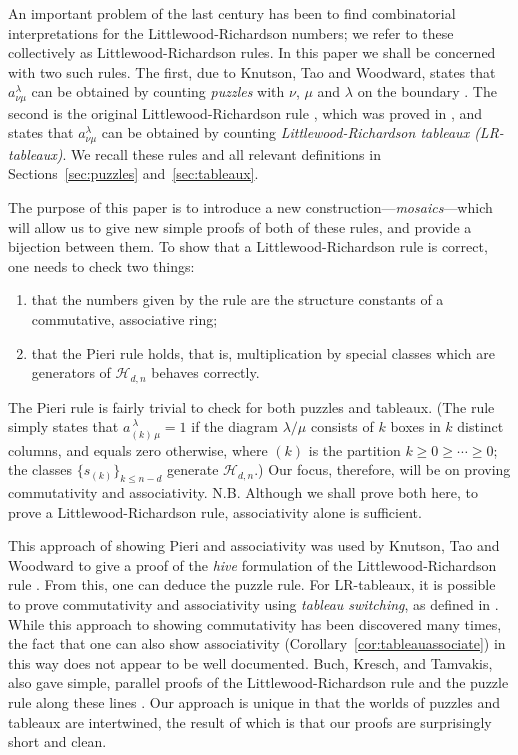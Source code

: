 \documentclass[12pt]{article}
\newcommand{\ringH}{\mathcal{H}_{d,n}}
\begin{document}
An important problem of the last century has been to find
combinatorial interpretations for the Littlewood-Richardson numbers;
we refer to these collectively as Littlewood-Richardson rules.
In this paper we shall be concerned with two such rules.  
The first, due to Knutson, Tao and Woodward, 
states that $a_{\nu \mu}^\lambda$ can be obtained by 
counting {\em puzzles} with $\nu$, $\mu$ and $\lambda$ on
the boundary \cite{knutson-tao-woodward}.  
The second is the original Littlewood-Richardson rule 
\cite{littlewood-richardson}, which
was proved in \cite{schutzenberger}, and
states that $a_{\nu \mu}^\lambda$ can be obtained by counting 
{\em Littlewood-Richardson tableaux (LR-tableaux)}.  We recall these 
rules and all relevant
definitions in Sections~\ref{sec:puzzles} and~\ref{sec:tableaux}.

The purpose of this paper is to introduce a new 
construction---{\em mosaics}---which will allow us to give new simple
proofs of both of these rules, and provide a bijection between them.
To show that a Littlewood-Richardson rule is correct, one
needs to check two things:
\begin{enumerate}
\item[(i)] that the numbers given by the rule are the
structure constants of a commutative, associative ring;
\item[(ii)] that the Pieri rule holds, that is, multiplication by
special classes which are generators of $\ringH$ behaves correctly.
\end{enumerate}
The Pieri rule is fairly trivial to check for both puzzles and tableaux.
(The rule simply states 
that $a_{(k)\,\mu}^{\ \lambda} = 1$ if the 
diagram $\lambda/\mu$ 
consists of $k$ boxes in $k$ distinct columns, and 
equals zero otherwise, 
where $(k)$ is the partition $k \geq 0 \geq \cdots \geq 0$;
the classes $\{s_{(k)}\}_{k \leq n-d}$ generate $\ringH$.)
Our focus, therefore,  will be on proving commutativity 
and associativity.  N.B. Although we shall prove both here, 
to prove a Littlewood-Richardson rule, associativity alone is
sufficient.

This approach of showing Pieri and associativity was used by 
Knutson, Tao and Woodward to give a proof of 
the {\em hive} formulation of the Littlewood-Richardson rule 
\cite{knutson-tao-woodward:octahedron}.  From this, one can deduce
the puzzle rule.  For LR-tableaux, it is possible to prove commutativity 
and associativity using {\em tableau switching}, as 
defined in \cite{benkart-sottile-stroomer}.  While this approach to
showing commutativity has been discovered many times, the fact that
one can also show associativity (Corollary~\ref{cor:tableauassociate}) 
in this way does not appear to be well documented.
Buch, Kresch, and Tamvakis, also gave simple, parallel proofs 
of the Littlewood-Richardson rule and the puzzle rule along these lines
\cite{buch-kresch-tamvakis}.
Our approach is unique in that the worlds of puzzles and tableaux are 
intertwined, the result of which is that our proofs are surprisingly
short and clean.
\end{document}
